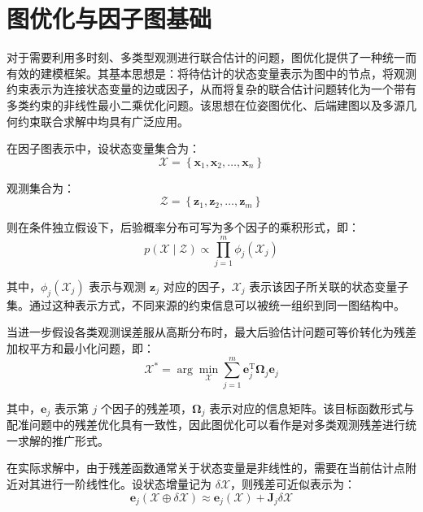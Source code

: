 \section{图优化与因子图基础}

对于需要利用多时刻、多类型观测进行联合估计的问题，图优化提供了一种统一而有效的建模框架。其基本思想是：将待估计的状态变量表示为图中的节点，将观测约束表示为连接状态变量的边或因子，从而将复杂的联合估计问题转化为一个带有多类约束的非线性最小二乘优化问题。该思想在位姿图优化、后端建图以及多源几何约束联合求解中均具有广泛应用。

在因子图表示中，设状态变量集合为：
\begin{equation}
\mathcal{X}
=
\left\{
\mathbf{x}_{1},\mathbf{x}_{2},\ldots,\mathbf{x}_{n}
\right\}
\end{equation}

观测集合为：
\begin{equation}
\mathcal{Z}
=
\left\{
\mathbf{z}_{1},\mathbf{z}_{2},\ldots,\mathbf{z}_{m}
\right\}
\end{equation}

则在条件独立假设下，后验概率分布可写为多个因子的乘积形式，即：
\begin{equation}
p\left(\mathcal{X}\mid \mathcal{Z}\right)
\propto
\prod_{j=1}^{m}
\phi_{j}\left(\mathcal{X}_{j}\right)
\end{equation}

其中，$\phi_{j}(\mathcal{X}_{j})$ 表示与观测 $\mathbf{z}_{j}$ 对应的因子，$\mathcal{X}_{j}$ 表示该因子所关联的状态变量子集。通过这种表示方式，不同来源的约束信息可以被统一组织到同一图结构中。

当进一步假设各类观测误差服从高斯分布时，最大后验估计问题可等价转化为残差加权平方和最小化问题，即：
\begin{equation}
\mathcal{X}^{\ast}
=
\arg \min_{\mathcal{X}}
\sum_{j=1}^{m}
\mathbf{e}_{j}^{\mathrm T}
\boldsymbol{\Omega}_{j}
\mathbf{e}_{j}
\end{equation}

其中，$\mathbf{e}_{j}$ 表示第 $j$ 个因子的残差项，$\boldsymbol{\Omega}_{j}$ 表示对应的信息矩阵。该目标函数形式与配准问题中的残差优化具有一致性，因此图优化可以看作是对多类观测残差进行统一求解的推广形式。

在实际求解中，由于残差函数通常关于状态变量是非线性的，需要在当前估计点附近对其进行一阶线性化。设状态增量记为 $\delta \mathcal{X}$，则残差可近似表示为：
\begin{equation}
\mathbf{e}_{j}\left(\mathcal{X}\oplus \delta \mathcal{X}\right)
\approx
\mathbf{e}_{j}\left(\mathcal{X}\right)
+\mathbf{J}_{j}\delta \mathcal{X}
\end{equation}

